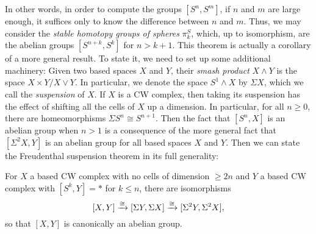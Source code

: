 \documentclass[../main.tex]{subfiles}
\begin{document}
In other words, in order to compute the groups $[S^n,S^m]$, if $n$ and $m$ are large enough, it suffices only to know the difference between $n$ and $m$. Thus, we may consider the \emph{stable homotopy groups of spheres} $\pi^S_k$, which, up to isomorphism, are the abelian groups $[S^{n+k},S^k]$ for $n>k+1$. This theorem is actually a corollary of a more general result. To state it, we need to set up some additional machinery: Given two based spaces $X$ and $Y$, their \emph{smash product} $X\wedge Y$ is the space $X\times Y/X\vee Y$. In particular, we denote the space $S^1\wedge X$ by $\Sigma X$, which we call the \emph{suspension} of $X$. If $X$ is a CW complex, then taking its suspension has the effect of shifting all the cells of $X$ up a dimension. In particular, for all $n\geq0$, there are homeomorphisms $\Sigma S^n\cong S^{n+1}$. Then the fact that $[S^n,X]$ is an abelian group when $n>1$ is a consequence of the more general fact that $[\Sigma^2X,Y]$ is an abelian group for all based spaces $X$ and $Y$. Then we can state the Freudenthal suspension theorem in its full generality:

\begin{theorem}
    For $X$ a based CW complex with no cells of dimension $\geq 2n$ and $Y$ a based CW complex with $[S^k,Y]=*$ for $k\leq n$, there are isomorphisms
    \[[X,Y]\xrightarrow\cong[\Sigma Y,\Sigma X]\xrightarrow\cong[\Sigma^2Y,\Sigma^2X],\]
    so that $[X,Y]$ is canonically an abelian group.
\end{theorem}

\end{document}

